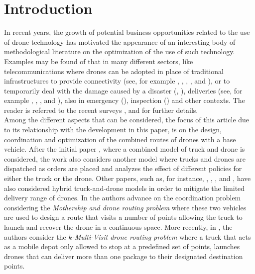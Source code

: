 \documentclass[10pt,a4paper]{elsarticle}
\newcommand{\EN}[1]{{\color{black}#1}}
\begin{document}
\section{Introduction}
\noindent
In recent years, the grow\EN{th} of potential business opportunities related to the use of drone technology ha\EN{s} motivated the appearance of an interesting body of methodological literature on the optimization of the use of such technology. 
\EN{Examples may be found} of that in many different sectors, like telecommunications where drones can be adopted in place of traditional infrastructures to provide connectivity (see, for example \cite{art:Amorosi2018}, \cite{art:Chiaraviglio2018}, \cite{Jimenez2018}, \cite{art:Amorosi2019}, and \cite{art:Chiaraviglio2019a}), or to temporar\EN{il}y deal with the damage caused by a disaster (\cite{art:Chiaraviglio2019}, \cite{art:Saldanha2021}), deliveries (see, for example \cite{art:Mathew2015} , \cite{art:Ferrandez2016}, \cite{art:Poikonen2020}, \cite{art:Amorosi2020} and \cite{art:PeiXu2021}), also in emergency (\cite{art:Wen2016}), inspection (\cite{art:Trotta2018}) and other \EN{contexts}.
The reader is referred to the recent surveys \cite{art:Otto2018}, \cite{art:Chung2020} and \cite{art:Saldanha2021} for further details.\\
\noindent
Among the different aspects that can be considered, \EN{the focus of this article} due to its relationship with the development in this paper, \EN{is on} the design, coordination and optimization of the combined routes of drones with a base vehicle. After the initial paper \cite{MURRAY201586}, where a combined model of truck and drone is considered, the work \cite{Ulmer2018} also considers another model where trucks and drones are dispatched as orders are placed and analyze\EN{s} the effect of different policies for either the truck or the drone. Other papers, \EN{such} as, for instance, \cite{art:Campbell2017}, \cite{art:Carlsson2017}, \cite{art:Dayarian2017}, \cite{art:Amorosi2022} and \cite{art:DellAmico2021}, have also considered hybrid truck-and-drone models in order to mitigate the limited delivery range of drones. In \cite{Poikonen2019} the authors advance on the coordination problem considering the \textit{Mothership and drone routing problem} where these two vehicles are used to design a route that visits a number of points allowing the truck to launch and recover the drone in a continuous space. More recently, in \cite{art:Poikonen2020}, the authors consider the \textit{$k$-Multi-Visit drone routing problem} where a truck that acts as a mobile depot only allowed to stop \EN{at} a predefined set of points, launches drones that can deliver more than one package to their designated destination points. 
\end{document}

